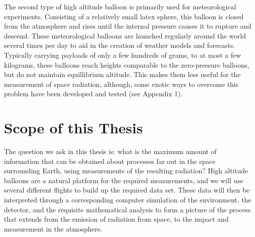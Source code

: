 The second type of high altitude balloon is primarily used for meteorological experiments. Consisting of a relatively small latex sphere, this balloon is closed from the atmosphere and rises until the internal pressure causes it to rupture and descend. These meteorological balloons are launched regularly around the world several times per day to aid in the creation of weather models and forecasts. Typically carrying payloads of only a few hundreds of grams, to at most a few kilograms, these balloons reach heights comparable to the zero-pressure balloons, but do not maintain equillibrium altitude. This makes them less useful for the measurement of space radiation, although, some exotic ways to overcome this problem have been developed and tested (see Appendix 1). 


\section{Scope of this Thesis}

The question we ask in this thesis is: what is the maximum amount of information that can be obtained about processes far out in the space surrounding Earth, using measurements of the resulting radiation? High altitude balloons are a natural platform for the required measurements, and we will use several different flights to build up the required data set. These data will then be interpreted through a corresponding computer simulation of the environment, the detector, and the requisite mathematical analysis to form a picture of the process that extends from the emission of radiation from space, to the impact and measurement in the atmosphere. 

 



